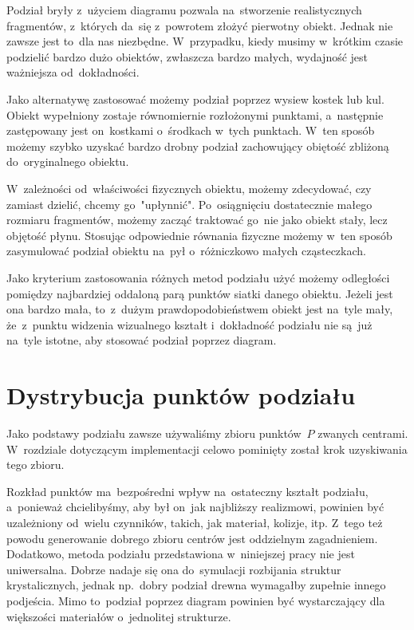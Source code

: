\documentclass[skorowidz,autorrok,backref,xodstep,oswiadczenie]{wmimgr}
\begin{document}
Podział bryły z~użyciem diagramu pozwala na~stworzenie realistycznych fragmentów, z~których da~się z~powrotem złożyć pierwotny obiekt. Jednak nie zawsze jest to~dla nas niezbędne. W~przypadku, kiedy musimy w~krótkim czasie podzielić bardzo dużo obiektów, zwłaszcza bardzo małych, wydajność jest ważniejsza od~dokładności.

Jako alternatywę zastosować możemy podział poprzez wysiew kostek lub kul. Obiekt wypełniony zostaje równomiernie rozłożonymi punktami, a~następnie zastępowany jest on~kostkami o~środkach w~tych punktach. W~ten sposób możemy szybko uzyskać bardzo drobny podział zachowujący obiętość zbliżoną do~oryginalnego obiektu.

W~zależności od~właściwości fizycznych obiektu, możemy zdecydować, czy zamiast dzielić, chcemy go~"upłynnić". Po~osiągnięciu dostatecznie małego rozmiaru fragmentów, możemy zacząć traktować go~nie jako obiekt stały, lecz objętość płynu. Stosując odpowiednie równania fizyczne możemy w~ten sposób zasymulować podział obiektu na~pył o~różniczkowo małych cząsteczkach.

Jako kryterium zastosowania różnych metod podziału użyć możemy odległości pomiędzy najbardziej oddaloną parą punktów siatki danego obiektu. Jeżeli jest ona bardzo mała, to~z~dużym prawdopodobieństwem obiekt jest na~tyle mały, że~z~punktu widzenia wizualnego kształt i~dokładność podziału nie są~już na~tyle istotne, aby stosować podział poprzez diagram.

\section{Dystrybucja punktów podziału}

Jako podstawy podziału zawsze używaliśmy zbioru punktów~$P$ zwanych centrami. W~rozdziale dotyczącym implementacji celowo pominięty został krok uzyskiwania tego zbioru.

Rozkład punktów ma~bezpośredni wpływ na~ostateczny kształt podziału, a~ponieważ chcielibyśmy, aby był on~jak najbliższy realizmowi, powinien być uzależniony od~wielu czynników, takich, jak materiał, kolizje, itp. Z~tego też powodu generowanie dobrego zbioru centrów jest oddzielnym zagadnieniem. Dodatkowo, metoda podziału przedstawiona w~niniejszej pracy nie jest uniwersalna. Dobrze nadaje się ona do~symulacji rozbijania struktur krystalicznych, jednak np.~dobry podział drewna wymagałby zupełnie innego podjeścia. Mimo to~podział poprzez diagram powinien być wystarczający dla większości materiałów o~jednolitej strukturze.
\end{document}
